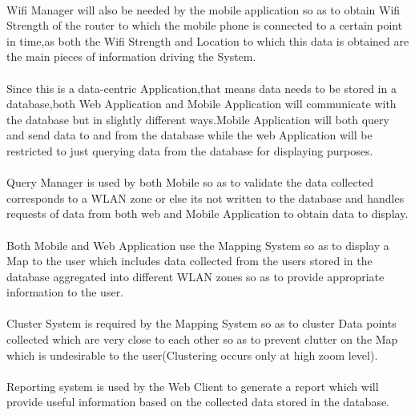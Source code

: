 \paragraph{}Wifi Manager will also be needed by the mobile application so as to obtain Wifi Strength of the router to which the mobile phone is connected to a certain point in time,as both the Wifi Strength and Location to which this data is obtained are the main pieces of information driving the System.

\paragraph{}Since this is a data-centric Application,that means data needs to be stored in a database,both Web Application and Mobile Application will communicate with the database but in slightly different ways.Mobile Application will both query and send data to and from the database while
the web Application will be restricted to just querying data from the database for displaying purposes.

\paragraph{}Query Manager is used by both Mobile so as to validate the data collected corresponds to a WLAN zone or else its not written to the database and handles requests of data from both web and Mobile Application to obtain data to display.

\paragraph{}Both Mobile and Web Application use the Mapping System so as to display a Map to the user which includes data collected from the users stored in the database aggregated into different WLAN zones so as to provide appropriate information to the user.

\paragraph{}Cluster System is required by the Mapping System so as to cluster Data points collected which are very close to each other so as to prevent clutter on the Map which is undesirable to the user(Clustering occurs only at high zoom level).  

\paragraph{}Reporting system is used by the Web Client to generate a report which will provide useful information based on the collected data stored in the database.   
 
